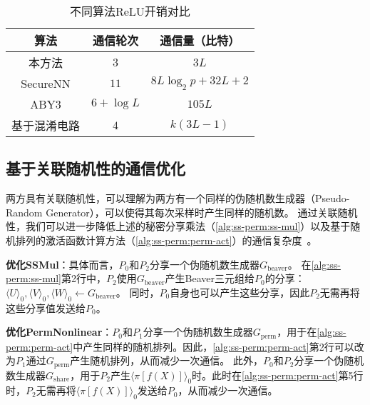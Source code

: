 \begin{table}[t]
    \caption{不同算法ReLU开销对比}
    \label{tab:ss-perm:relu}
    \centering
    \begin{tabular}{ccc}
    \toprule
    算法 & 通信轮次 & 通信量（比特） \\ 
    \midrule
    本方法 & $3$ & $3L$ \\
    SecureNN\cite{wagh2019securenn} & $11$ & $8L\log_2 p + 32L + 2$ \\
    ABY3\cite{mohassel2018aby3} & $6 + \log L$ & $105L$ \\
    基于混淆电路\cite{rouhani2018deepsecure} & $4$ & $k(3L - 1)$ \\
    \bottomrule
    \end{tabular}
\end{table}

\subsection{基于关联随机性的通信优化}
两方具有关联随机性，可以理解为两方有一个同样的伪随机数生成器（Pseudo-Random Generator），可以使得其每次采样时产生同样的随机数。
%
通过关联随机性，我们可以进一步降低上述的秘密分享乘法（\autoref{alg:ss-perm:ss-mul}）以及基于随机排列的激活函数计算方法（\autoref{alg:ss-perm:perm-act}）的通信复杂度~\cite{riazi_2018_chameleon}。
%

\textbf{优化\textsf{SSMul}}：具体而言，$P_0$和$P_2$分享一个伪随机数生成器$G_\text{beaver}$。
在\autoref{alg:ss-perm:ss-mul}第2行中，$P_2$使用$G_\text{beaver}$产生Beaver三元组给$P_0$的分享：$\langle U \rangle_0, \langle V \rangle_0, \langle W \rangle_0 \gets G_\text{beaver}$。
同时，$P_0$自身也可以产生这些分享，因此$P_2$无需再将这些分享值发送给$P_0$。


\textbf{优化\textsf{PermNonlinear}}：$P_0$和$P_1$分享一个伪随机数生成器$G_\text{perm}$，用于在\autoref{alg:ss-perm:perm-act}中产生同样的随机排列。因此，\autoref{alg:ss-perm:perm-act}第2行可以改为$P_1$通过$G_\text{perm}$产生随机排列，从而减少一次通信。
%
此外，$P_0$和$P_2$分享一个伪随机数生成器$G_\text{share}$，用于$P_2$产生$\langle \pi[f(X)] \rangle_0$时。此时在\autoref{alg:ss-perm:perm-act}第5行时，$P_2$无需再将$\langle \pi[f(X)] \rangle_0$发送给$P_0$，从而减少一次通信。


